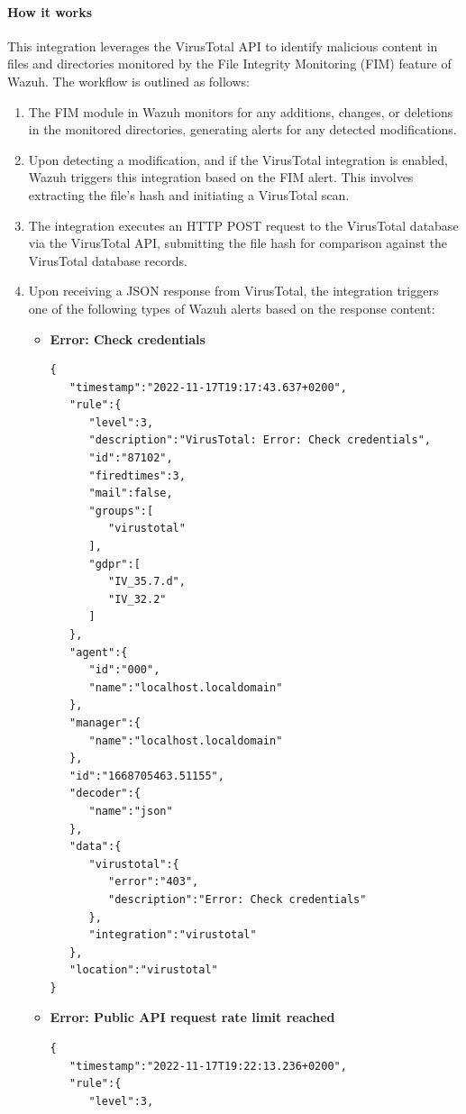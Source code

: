 \paragraph{How it works}
This integration leverages the VirusTotal API to identify malicious content in files and directories monitored by the File Integrity Monitoring (FIM) feature of Wazuh. The workflow is outlined as follows:

\begin{enumerate}
    \item The FIM module in Wazuh monitors for any additions, changes, or deletions in the monitored directories, generating alerts for any detected modifications.
    \item Upon detecting a modification, and if the VirusTotal integration is enabled, Wazuh triggers this integration based on the FIM alert. This involves extracting the file's hash and initiating a VirusTotal scan.
    \item The integration executes an HTTP POST request to the VirusTotal database via the VirusTotal API, submitting the file hash for comparison against the VirusTotal database records.
    \item Upon receiving a JSON response from VirusTotal, the integration triggers one of the following types of Wazuh alerts based on the response content:
    \begin{itemize}
        \item \textbf{Error: Check credentials}
        \begin{verbatim}
{
   "timestamp":"2022-11-17T19:17:43.637+0200",
   "rule":{
      "level":3,
      "description":"VirusTotal: Error: Check credentials",
      "id":"87102",
      "firedtimes":3,
      "mail":false,
      "groups":[
         "virustotal"
      ],
      "gdpr":[
         "IV_35.7.d",
         "IV_32.2"
      ]
   },
   "agent":{
      "id":"000",
      "name":"localhost.localdomain"
   },
   "manager":{
      "name":"localhost.localdomain"
   },
   "id":"1668705463.51155",
   "decoder":{
      "name":"json"
   },
   "data":{
      "virustotal":{
         "error":"403",
         "description":"Error: Check credentials"
      },
      "integration":"virustotal"
   },
   "location":"virustotal"
}
        \end{verbatim}
        \item \textbf{Error: Public API request rate limit reached}
\begin{verbatim}
{
   "timestamp":"2022-11-17T19:22:13.236+0200",
   "rule":{
      "level":3,

\end{verbatim}
\end{itemize}
\end{enumerate}
